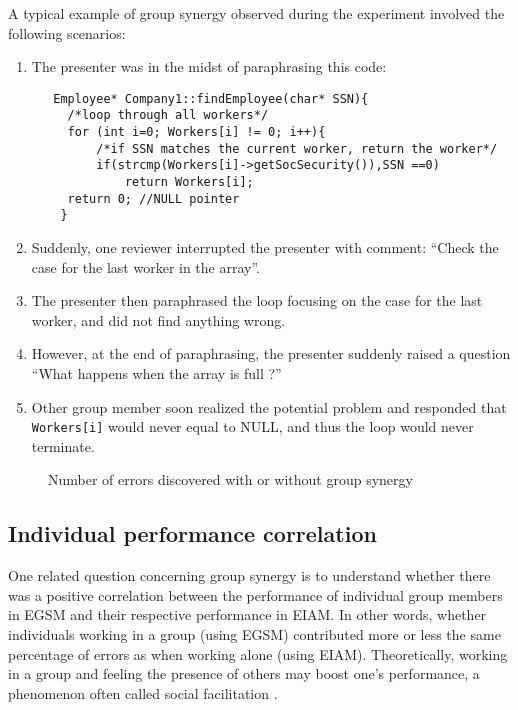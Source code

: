 A typical example of group synergy observed during the experiment
involved the following scenarios:
\begin{enumerate}
\item The presenter was in the midst of paraphrasing this code:
\small
\begin{verbatim}
   Employee* Company1::findEmployee(char* SSN){
     /*loop through all workers*/
     for (int i=0; Workers[i] != 0; i++){
         /*if SSN matches the current worker, return the worker*/
         if(strcmp(Workers[i]->getSocSecurity()),SSN ==0)
             return Workers[i];
     return 0; //NULL pointer
    }
\end{verbatim}
\normalsize
\item Suddenly, one reviewer interrupted the presenter with comment:
``Check the case for the last worker in the array''.
\item The presenter then paraphrased the loop focusing on 
the case for the last worker, and did not find anything wrong.
\item However, at the end of paraphrasing, the presenter suddenly
raised a question ``What happens when the array is full ?''
\item Other group member soon realized the potential problem and
responded that {\tt Workers[i]} would never
equal to NULL, and thus the loop would never terminate.
\end{enumerate}


\begin{figure}[htb]
 {\centerline{}}
 \caption{Number of errors discovered with or without group synergy}
 \label{synergy}
\end{figure}


\subsection{Individual performance correlation}
One related question concerning group synergy is
 to understand whether there was a
positive correlation between the performance of individual group
members in EGSM and their respective performance in EIAM. In other words,  
whether individuals working in a group (using EGSM) contributed
more or less the same  percentage of errors as when working alone
(using EIAM). Theoretically, working in a group and feeling the presence
of others may boost one's performance, a phenomenon often
called social facilitation \cite{Myers90}. 


